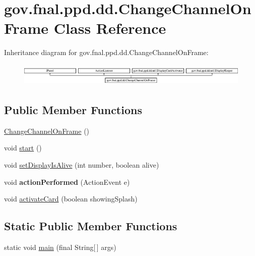 \hypertarget{classgov_1_1fnal_1_1ppd_1_1dd_1_1ChangeChannelOnFrame}{\section{gov.\-fnal.\-ppd.\-dd.\-Change\-Channel\-On\-Frame Class Reference}
\label{classgov_1_1fnal_1_1ppd_1_1dd_1_1ChangeChannelOnFrame}
}
Inheritance diagram for gov.\-fnal.\-ppd.\-dd.\-Change\-Channel\-On\-Frame\-:\begin{figure}[H]
\begin{center}
\leavevmode
\includegraphics[height=1.089494cm]{classgov_1_1fnal_1_1ppd_1_1dd_1_1ChangeChannelOnFrame}
\end{center}
\end{figure}
\subsection*{Public Member Functions}
\begin{DoxyCompactItemize}
\item 
\hyperlink{classgov_1_1fnal_1_1ppd_1_1dd_1_1ChangeChannelOnFrame_acd2a4889ad3015d36432ffc008200fea}{Change\-Channel\-On\-Frame} ()
\item 
void \hyperlink{classgov_1_1fnal_1_1ppd_1_1dd_1_1ChangeChannelOnFrame_a8f8b7b07db0c51eba9f70d411634b672}{start} ()
\item 
void \hyperlink{classgov_1_1fnal_1_1ppd_1_1dd_1_1ChangeChannelOnFrame_a2b9c678e5bdcbc7a9b42558522a4fbf5}{set\-Display\-Is\-Alive} (int number, boolean alive)
\item 
\hypertarget{classgov_1_1fnal_1_1ppd_1_1dd_1_1ChangeChannelOnFrame_acad20833a9724b967367100045622b5f}{void {\bfseries action\-Performed} (Action\-Event e)}\label{classgov_1_1fnal_1_1ppd_1_1dd_1_1ChangeChannelOnFrame_acad20833a9724b967367100045622b5f}

\item 
void \hyperlink{classgov_1_1fnal_1_1ppd_1_1dd_1_1ChangeChannelOnFrame_a3470581941af187cc09c9e896aeb5b3a}{activate\-Card} (boolean showing\-Splash)
\end{DoxyCompactItemize}
\subsection*{Static Public Member Functions}
\begin{DoxyCompactItemize}
\item 
static void \hyperlink{classgov_1_1fnal_1_1ppd_1_1dd_1_1ChangeChannelOnFrame_a3da612c5cdc054e61ce032b460f9277b}{main} (final String\mbox{[}$\,$\mbox{]} args)
\end{DoxyCompactItemize}
